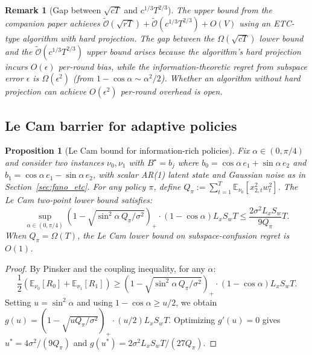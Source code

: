 \documentclass[12pt]{article}
\newcommand{\E}{\mathbb{E}}
\newcommand{\tilO}{\widetilde{\mathcal{O}}}
\newtheorem{proposition}{Proposition}
\newtheorem{remark}{Remark}
\theoremstyle{plain}
\theoremstyle{definition}
\begin{document}
\begin{remark}[Gap between $\sqrt{cT}$ and $c^{1/3}T^{2/3}$]
\label{rem:rate_gap}
The upper bound from the companion paper achieves $\tilO(\sqrt{rT}) + \tilO(c^{1/3}T^{2/3}) + O(V)$ using an ETC-type algorithm with hard projection. The gap between the $\Omega(\sqrt{cT})$ lower bound and the $\tilO(c^{1/3}T^{2/3})$ upper bound arises because the algorithm's hard projection incurs $O(\epsilon)$ per-round bias, while the information-theoretic regret from subspace error $\epsilon$ is $\Omega(\epsilon^2)$ (from $1 - \cos\alpha \sim \alpha^2/2$). Whether an algorithm without hard projection can achieve $O(\epsilon^2)$ per-round overhead is open.
\end{remark}

\subsection{Le Cam barrier for adaptive policies}

\begin{proposition}[Le Cam bound for information-rich policies]
\label{prop:lecam_barrier}
Fix $\alpha \in (0, \pi/4)$ and consider two instances $\nu_0, \nu_1$ with $B^\star = b_j$ where $b_0 = \cos\alpha\, e_1 + \sin\alpha\, e_2$ and $b_1 = \cos\alpha\, e_1 - \sin\alpha\, e_2$, with scalar AR(1) latent state and Gaussian noise as in Section~\ref{sec:fano_etc}. For any policy $\pi$, define $Q_\pi := \sum_{t=1}^T \E_{\nu_0}[x_{2,t}^2 w_t^2]$. The Le Cam two-point lower bound satisfies:
\begin{equation}
\sup_{\alpha \in (0,\pi/4)}
(1 - \sqrt{\sin^2\!\alpha\, Q_\pi / \sigma^2})_+
\cdot (1 - \cos\alpha) L_x S_w T
\le \frac{2\sigma^2 L_x S_w}{9 Q_\pi} T.
\label{eq:lecam_bound}
\end{equation}
When $Q_\pi = \Omega(T)$, the Le Cam lower bound on subspace-confusion regret is $O(1)$.
\end{proposition}

\begin{proof}
By Pinsker and the coupling inequality, for any $\alpha$:
\[
\frac{1}{2}(\E_{\nu_0}[R_0] + \E_{\nu_1}[R_1])
\ge (1 - \sqrt{\sin^2\!\alpha\, Q_\pi / \sigma^2})_+ \cdot (1 - \cos\alpha) L_x S_w T.
\]
Setting $u = \sin^2\!\alpha$ and using $1 - \cos\alpha \ge u/2$, we obtain $g(u) = (1 - \sqrt{uQ_\pi/\sigma^2})_+ \cdot (u/2) L_x S_w T$. Optimizing $g'(u) = 0$ gives $u^* = 4\sigma^2/(9Q_\pi)$ and $g(u^*) = 2\sigma^2 L_x S_w T/(27Q_\pi)$.
\end{proof}
\end{document}
